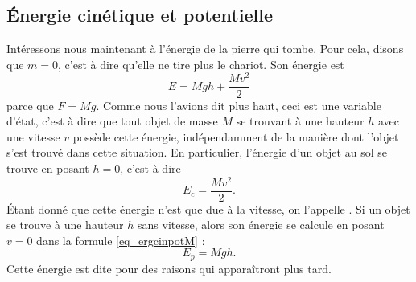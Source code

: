 \subsection{Énergie cinétique et potentielle}

Intéressons nous maintenant à l'énergie de la pierre qui tombe. Pour cela, disons que $m=0$, c'est à dire qu'elle ne tire plus le chariot. Son énergie est
\begin{equation}  \label{eq_ergcinpotM}
  E=Mgh+\frac{ Mv^2 }{ 2 }
\end{equation}
parce que $F=Mg$. Comme nous l'avions dit plus haut, ceci est une variable d'état, c'est à dire que tout objet de masse $M$ se trouvant à une hauteur $h$ avec une vitesse $v$ possède cette énergie, indépendamment de la manière dont l'objet s'est trouvé dans cette situation. En particulier, l'énergie d'un objet au sol se trouve en posant $h=0$, c'est à dire
\begin{equation}
  E_c=\frac{ Mv^2 }{ 2 }.
\end{equation}
Étant donné que cette énergie n'est que due à la vitesse, on l'appelle . Si un objet se trouve à une hauteur $h$ sans vitesse, alors son énergie se calcule en posant $v=0$ dans la formule \eqref{eq_ergcinpotM} :
\begin{equation}
  E_p=Mgh.
\end{equation}
Cette énergie est dite  pour des raisons qui apparaîtront plus tard. 



